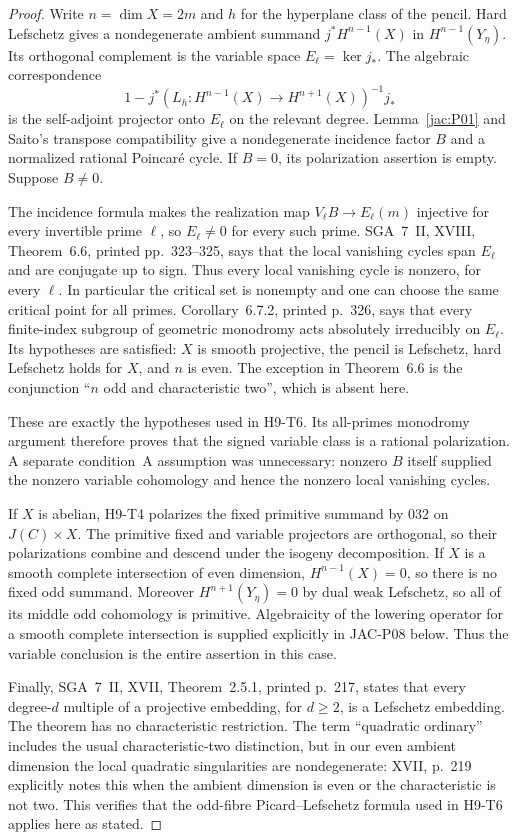 \documentclass[11pt,a4paper]{article}
\begin{document}
\begin{proof}
Write $n=\dim X=2m$ and $h$ for the hyperplane class of the pencil.
Hard Lefschetz gives a nondegenerate ambient summand
$j^*H^{n-1}(X)$ in $H^{n-1}(Y_\eta)$.  Its orthogonal complement is
the variable space $E_\ell=\ker j_*$.  The algebraic correspondence
\[
 1-j^*(L_h:H^{n-1}(X)\longrightarrow H^{n+1}(X))^{-1}j_*
\]
is the self-adjoint projector onto $E_\ell$ on the relevant degree.
Lemma~\ref{jac:P01} and Saito's transpose compatibility give a
nondegenerate incidence factor $B$ and a normalized rational
Poincar\'e cycle.  If $B=0$, its polarization assertion is empty.
Suppose $B\ne0$.

The incidence formula makes the realization map
$V_\ell B\to E_\ell(m)$ injective for every invertible prime $\ell$,
so $E_\ell\ne0$ for every such prime.  SGA~7~II, XVIII,
Theorem~6.6, printed pp.~323--325, says that the local vanishing
cycles span $E_\ell$ and are conjugate up to sign.  Thus every local
vanishing cycle is nonzero, for every $\ell$.  In particular the
critical set is nonempty and one can choose the same critical point
for all primes.  Corollary~6.7.2, printed p.~326, says that every
finite-index subgroup of geometric monodromy acts absolutely
irreducibly on $E_\ell$.  Its hypotheses are satisfied: $X$ is smooth
projective, the pencil is Lefschetz, hard Lefschetz holds for $X$, and
$n$ is even.  The exception in Theorem~6.6 is the conjunction
``$n$ odd and characteristic two'', which is absent here.

These are exactly the hypotheses used in H9-T6.  Its all-primes
monodromy argument therefore proves that the signed variable class
is a rational polarization.  A separate condition~A assumption was
unnecessary: nonzero $B$ itself supplied the nonzero variable
cohomology and hence the nonzero local vanishing cycles.

If $X$ is abelian, H9-T4 polarizes the fixed primitive summand by 032
on $J(C)\times X$.  The primitive fixed and variable projectors are
orthogonal, so their polarizations combine and descend under the
isogeny decomposition.  If $X$ is a smooth complete intersection of
even dimension, $H^{n-1}(X)=0$, so there is no fixed odd summand.
Moreover $H^{n+1}(Y_\eta)=0$ by dual weak Lefschetz, so all of its
middle odd cohomology is primitive.  Algebraicity of the lowering
operator for a smooth complete intersection is supplied explicitly
in JAC-P08 below.  Thus the variable conclusion is the entire
assertion in this case.

Finally, SGA~7~II, XVII, Theorem~2.5.1, printed p.~217, states that
every degree-$d$ multiple of a projective embedding, for $d\ge2$,
is a Lefschetz embedding.  The theorem has no characteristic
restriction.  The term ``quadratic ordinary'' includes the usual
characteristic-two distinction, but in our even ambient dimension
the local quadratic singularities are nondegenerate: XVII, p.~219
explicitly notes this when the ambient dimension is even or the
characteristic is not two.  This verifies that the odd-fibre
Picard--Lefschetz formula used in H9-T6 applies here as stated.
\end{proof}
\end{document}
